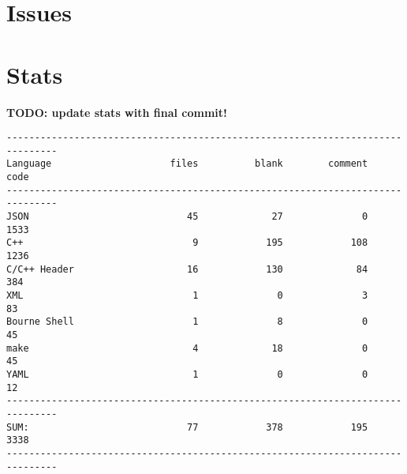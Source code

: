 \documentclass[paper=a4, fontsize=11pt, abstract=on]{scrartcl} %
\numberwithin{equation}{section} %
\numberwithin{figure}{section} %
\numberwithin{table}{section} %
\begin{document}
\section{Issues}

\section{Stats}

\textbf{TODO: update stats with final commit!}

\begin{verbatim}
-------------------------------------------------------------------------------
Language                     files          blank        comment           code
-------------------------------------------------------------------------------
JSON                            45             27              0           1533
C++                              9            195            108           1236
C/C++ Header                    16            130             84            384
XML                              1              0              3             83
Bourne Shell                     1              8              0             45
make                             4             18              0             45
YAML                             1              0              0             12
-------------------------------------------------------------------------------
SUM:                            77            378            195           3338
-------------------------------------------------------------------------------
\end{verbatim}
\end{document}

